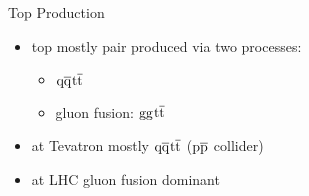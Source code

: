 \begin{frame}{Top Production}

	\begin{itemize}\itemfill
		\item top mostly pair produced via two processes:
		\begin{itemize}
			\item $\text{q}\overline{\text{q}}$\ch{->}$\text{t}\overline{\text{t}}$
			\item gluon fusion: $\text{g}\text{g}$\ch{->}$\text{t}\overline{\text{t}}$
		\end{itemize}
	\end{itemize}
	
	\begin{figure}\vspace*{-10pt}
		\centering
	\end{figure}\vspace*{-10pt}
	
	\begin{itemize}\itemfill
		\item at Tevatron mostly $\text{q}\overline{\text{q}}$\ch{->}$\text{t}\overline{\text{t}}$ (\ra $\text{p}\overline{\text{p}}$ collider)
		\item at LHC gluon fusion dominant
	\end{itemize}

\end{frame}
